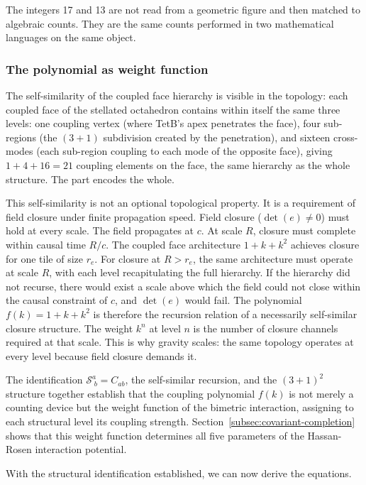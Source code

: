 \documentclass[aps,prd,preprint,superscriptaddress,showpacs,preprintnumbers,amsmath,amssymb,nofootinbib]{revtex4-2}
\begin{document}
The integers 17 and 13 are not read from a geometric figure and then matched to algebraic counts. They are the same counts performed in two mathematical languages on the same object.

\subsubsection*{The polynomial as weight function}

The self-similarity of the coupled face hierarchy is visible in the topology: each coupled face of the stellated octahedron contains within itself the same three levels: one coupling vertex (where TetB's apex penetrates the face), four sub-regions (the $(3{+}1)$ subdivision created by the penetration), and sixteen cross-modes (each sub-region coupling to each mode of the opposite face), giving $1 + 4 + 16 = 21$ coupling elements on the face, the same hierarchy as the whole structure. The part encodes the whole.

This self-similarity is not an optional topological property. It is a requirement of field closure under finite propagation speed. Field closure ($\det(e) \neq 0$) must hold at every scale. The field propagates at $c$. At scale $R$, closure must complete within causal time $R/c$. The coupled face architecture $1 + k + k^2$ achieves closure for one tile of size $r_e$. For closure at $R > r_e$, the same architecture must operate at scale $R$, with each level recapitulating the full hierarchy. If the hierarchy did not recurse, there would exist a scale above which the field could not close within the causal constraint of $c$, and $\det(e)$ would fail. The polynomial $f(k) = 1 + k + k^2$ is therefore the recursion relation of a necessarily self-similar closure structure. The weight $k^n$ at level $n$ is the number of closure channels required at that scale. This is why gravity scales: the same topology operates at every level because field closure demands it.

The identification $\mathcal{S}^a_{\;b} = C_{ab}$, the self-similar recursion, and the $(3{+}1)^2$ structure together establish that the coupling polynomial $f(k)$ is not merely a counting device but the weight function of the bimetric interaction, assigning to each structural level its coupling strength. Section~\ref{subsec:covariant-completion} shows that this weight function determines all five parameters of the Hassan-Rosen interaction potential.

With the structural identification established, we can now derive the equations.
\end{document}
